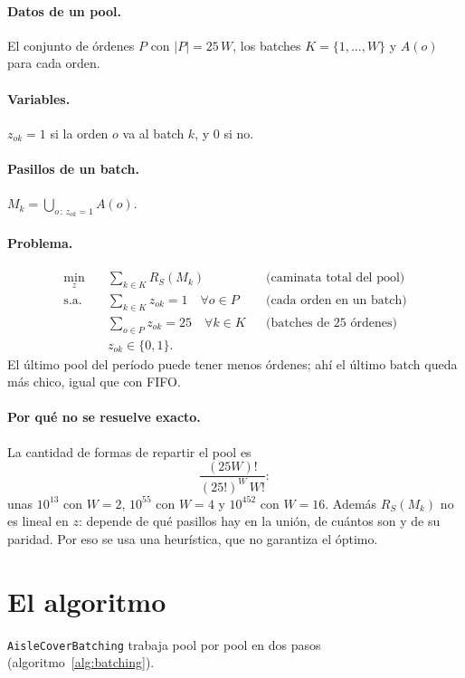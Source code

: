 \documentclass[11pt,a4paper,oneside]{report}
\newcommand{\code}[1]{\texttt{\small #1}}
\newcommand{\RS}{R_S}
\begin{document}
\paragraph{Datos de un pool.} El conjunto de órdenes $P$ con $|P| = 25\,W$, los batches
$K = \{1, \dots, W\}$ y $A(o)$ para cada orden.

\paragraph{Variables.} $z_{ok} = 1$ si la orden $o$ va al batch $k$, y 0 si no.

\paragraph{Pasillos de un batch.} $M_k = \bigcup_{o\,:\,z_{ok} = 1} A(o)$.

\paragraph{Problema.}
\begin{align*}
\min_{z}\quad & \sum_{k \in K} \RS(M_k) && \text{(caminata total del pool)}\\
\text{s.a.}\quad & \sum_{k \in K} z_{ok} = 1 \quad \forall o \in P && \text{(cada orden en un batch)}\\
& \sum_{o \in P} z_{ok} = 25 \quad \forall k \in K && \text{(batches de 25 órdenes)}\\
& z_{ok} \in \{0,1\}.
\end{align*}
El último pool del período puede tener menos órdenes; ahí el último batch queda más chico,
igual que con FIFO.

\paragraph{Por qué no se resuelve exacto.} La cantidad de formas de repartir el pool es
\[
\frac{(25W)!}{(25!)^W\, W!}:
\]
unas $10^{13}$ con $W = 2$, $10^{55}$ con $W = 4$ y
$10^{452}$ con $W = 16$. Además $\RS(M_k)$ no es lineal en $z$: depende de qué pasillos hay
en la unión, de cuántos son y de su paridad. Por eso se usa una heurística, que no garantiza
el óptimo.

\section{El algoritmo}

\code{AisleCoverBatching} trabaja pool por pool en dos pasos (algoritmo~\ref{alg:batching}).
\end{document}
